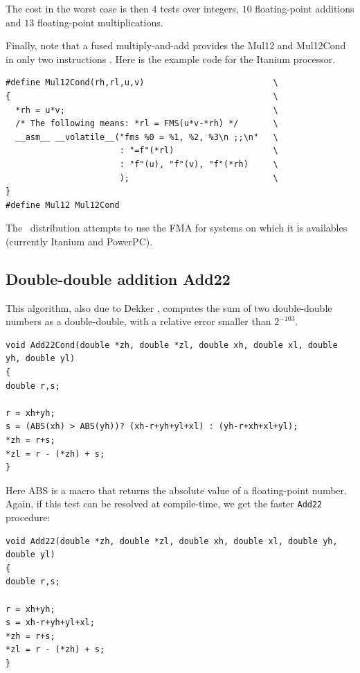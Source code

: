 The cost in the worst case is then $4$ tests over integers,
$10$ floating-point additions and $13$ floating-point multiplications.


Finally, note that a fused multiply-and-add provides the Mul12 and
Mul12Cond in only two instructions \cite{CorneaHarrisonTang2002}. Here
is the example code for the Itanium processor.

\begin{lstlisting}[label={lst:Mul12CondFMA},caption={Mul12 on the Itanium},firstnumber=1]
#define Mul12Cond(rh,rl,u,v)                          \
{                                                     \
  *rh = u*v;                                          \
  /* The following means: *rl = FMS(u*v-*rh) */       \
  __asm__ __volatile__("fms %0 = %1, %2, %3\n ;;\n"   \
                       : "=f"(*rl)                    \
                       : "f"(u), "f"(v), "f"(*rh)     \
                       );                             \
}
#define Mul12 Mul12Cond
\end{lstlisting}

The \crlibm\ distribution attempts to use the FMA for systems on which
it is availables (currently Itanium and PowerPC).




\subsection{Double-double addition {Add22}}
  
This algorithm, also due to Dekker \cite{Dek71}, computes the sum of
two double-double numbers as a double-double, with a relative error
smaller than $2^{-103}$.

\begin{lstlisting}[label={Add22Cond},caption={Add22Cond},firstnumber=1]
void Add22Cond(double *zh, double *zl, double xh, double xl, double yh, double yl)
{
double r,s;

r = xh+yh;
s = (ABS(xh) > ABS(yh))? (xh-r+yh+yl+xl) : (yh-r+xh+xl+yl);
*zh = r+s;
*zl = r - (*zh) + s;
}
\end{lstlisting}

Here ABS is a macro that returns the absolute value of a
floating-point number. Again, if this test can be resolved at
compile-time, we get the faster \texttt{Add22} procedure:

\begin{lstlisting}[label={Add22},caption={Add22},firstnumber=1]
void Add22(double *zh, double *zl, double xh, double xl, double yh, double yl)
{
double r,s;

r = xh+yh;
s = xh-r+yh+yl+xl;
*zh = r+s;
*zl = r - (*zh) + s;
}
\end{lstlisting}




